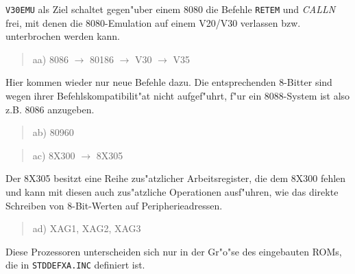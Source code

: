 \documentclass[12pt,a4paper,twoside]{report}
\newcommand{\tty}[1]{{\tt #1}}
\begin{document}
{\tt V30EMU} als Ziel schaltet gegen"uber einem 8080 die Befehle {\tt RETEM}
und {\em CALLN} frei, mit denen die 8080-Emulation auf einem V20/V30
verlassen bzw. unterbrochen werden kann.
\begin{quote}
aa) 8086 $\rightarrow$ 80186 $\rightarrow$ V30 $\rightarrow$ V35
\end{quote}
Hier kommen wieder nur neue Befehle dazu.  Die entsprechenden 8-Bitter sind
wegen ihrer Befehlskompatibilit"at nicht aufgef"uhrt, f"ur ein 8088-System
ist also z.B. 8086 anzugeben.
\begin{quote}
ab) 80960
\end{quote}
\begin{quote}
ac) 8X300 $\rightarrow$ 8X305
\end{quote}
Der 8X305 besitzt eine Reihe zus"atzlicher Arbeitsregister, die dem
8X300 fehlen und kann mit diesen auch zus"atzliche Operationen ausf"uhren,
wie das direkte Schreiben von 8-Bit-Werten auf Peripherieadressen.
\begin{quote}
ad) XAG1, XAG2, XAG3
\end{quote}
Diese Prozessoren unterscheiden sich nur in der Gr"o"se des eingebauten
ROMs, die in \tty{STDDEFXA.INC} definiert ist.
\end{document}
